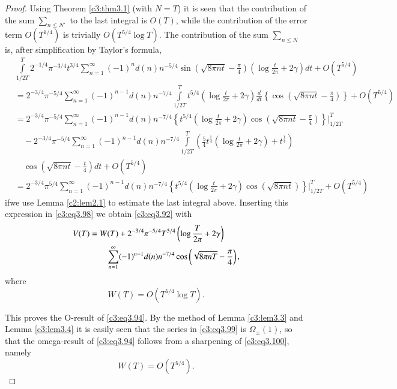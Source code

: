 \begin{proof}
Using Theorem \ref{c3:thm3.1} (with $N=T$) it is seen that the
contribution of the sum $\displaystyle{\sum_{n \leq N'}}$ to the last
integral is $O(T)$, while the contribution of the error term
$O(T^{1/4})$ is trivially $O(T^{5/4} \log T)$. The contribution of the
sum $\displaystyle{\sum_{n \leq N}}$ is, after simplification by
Taylor's formula,
{\fontsize{8}{10}\selectfont
\begin{align*}
  &\int\limits_{1/2 T}^T 2^{-1/4} \pi^{-3/4} t^{3/4} \sum_{n=1}^\infty
  (-1)^n d(n) n^{-5/4} \sin \left(\sqrt{8 \pi nt} -
  \frac{\pi}{4}\right) \left(\log \frac{t}{2\pi} + 2 \gamma \right) dt
  + O(T^{5/4})\\
  & = 2^{-3/4} \pi^{-5/4} \sum_{n=1}^\infty (-1)^{n-1} d(n) n^{- 7/4}
  \int\limits_{1/2 T}^{T} t^{5/4} \left(\log \frac{t}{2 \pi} + 2
  \gamma\right) \frac{d}{dt} \left\{\cos (\sqrt{8 \pi nt} -
  \frac{\pi}{4}) \right\} + O(T^{5/4})\\
  & = 2^{-3/4} \pi^{- 5/4} \sum_{n=1}^\infty (-1)^{n-1} d(n) n^{-7/4}
  \left\{t^{5/4} \left(\log \frac{t}{2 \pi} + 2 \gamma \right) \cos
  \left(\sqrt{8 \pi nt} - \frac{\pi}{4}\right)\right\}\Bigg|_{1/2 T}^T\\
  &\quad -2^{-3/4} \pi^{-5/4} \sum_{n=1}^\infty (-1)^{n-1} d(n) n^{-7/4}
  \int\limits_{1/2 T}^T \left(\frac{5}{4} t^{\frac{1}{4}} \left(\log
  \frac{t}{2\pi} + 2\gamma\right) + t^{\frac{1}{4}} \right)\\
&\quad \cos \left(\sqrt{8
  \pi nt}- \frac{t}{4}\right) dt + O(T^{5/4})\\
  & = 2^{-3/4} \pi^{5/4} \sum_{n=1}^\infty (-1)^{n-1} d(n)n^{-7/4}
  \left\{t^{5/4} \left( \log \frac{t}{2\pi} + 2 \gamma\right) \cos
  \left(\sqrt{8 \pi nt}\right) \right\}\Bigg|_{1/2 T}^T+ O(T^{5/4})
\end{align*}}
if\pageoriginale we use Lemma \ref{c2:lem2.1} to estimate the last
integral above. Inserting this expression in \eqref{c3:eq3.98} we
obtain \eqref{c3:eq3.92} with
\begin{align}
  V(T) & = W(T)+ 2^{-3/4} \pi^{-5/4}T^{5/4} \left(\log \frac{T}{2 \pi} +
  2 \gamma \right)\notag\\ 
  & \qquad\sum_{n=1}^\infty (-1)^{n-1} d(n) n^{-7/4} \cos
  \left(\sqrt{8 \pi n T} - \frac{\pi}{4}\right),\label{c3:eq3.99}
\end{align}
where
\begin{equation}
  W(T)  = O(T^{5/4} \log T).\label{c3:eq3.100}
\end{equation}

This proves the O-result of \eqref{c3:eq3.94}. By the method of Lemma
\ref{c3:lem3.3} and Lemma \ref{c3:lem3.4} it is easily seen that the
series in \eqref{c3:eq3.99} is $\Omega_\pm (1)$, so that the
omega-result of \eqref{c3:eq3.94} follows from a sharpening of
\eqref{c3:eq3.100}, namely
\begin{equation}
  W(T) = O(T^{5/4}). \label{c3:eq3.101}
\end{equation}


\end{proof}
